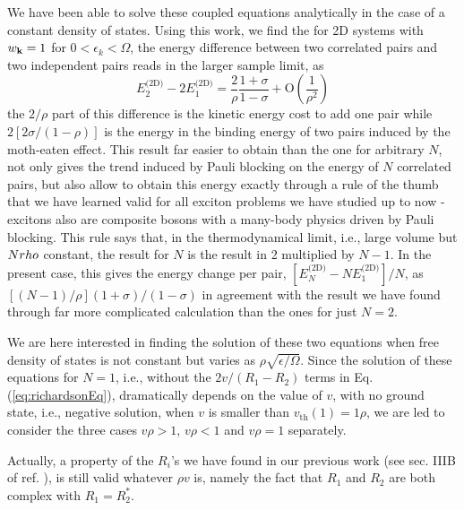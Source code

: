 \documentclass{article}
\newcommand{\td}{{\ensuremath{{\text{(2D)}}}}}
\begin{document}
We have been able to solve these coupled equations analytically in the case of a constant density of states\cite{combescotBCS}.  Using this work, we find the for 2D systems with $w_{\mathbf{k}}=1$ for $0<\epsilon_k<\Omega$, the energy difference between two correlated pairs and two independent pairs reads in the larger sample limit, as 
\begin{equation}
E^{\td}_2-2E_1^{\td}=\frac{2}{\rho}\frac{1+\sigma}{1-\sigma}+\text{O}(\frac{1}{\rho^2})
\label{eq:}
\end{equation}
the $2/\rho$ part of this difference is the kinetic energy cost to add one pair while $2[2\sigma/(1-\rho)]$ is the energy in the binding energy of two pairs induced by the moth-eaten effect. This result far easier to obtain than the one for arbitrary $N$, not only gives the trend induced by Pauli blocking on the energy of $N$ correlated pairs, but also allow to obtain this energy exactly through a rule of the thumb that we have learned valid for all exciton problems we have studied up to now -excitons also are composite bosons with a many-body physics driven by Pauli blocking.  This rule says that, in the thermodynamical limit, i.e., large volume but $N\\rho$ constant, the result for $N$ is the result in 2 multiplied by $N-1$.  In the present case, this gives the energy change per pair, $[E^{\td}_N-NE^{\td}_1]/N$, as $[(N-1)/\rho](1+\sigma)/(1-\sigma)$ in agreement with the result we have found through far more complicated calculation than the ones for just $N=2$.

We are here interested in finding the solution of these two equations when free density of states is not constant but varies as $\rho\sqrt{\epsilon/\Omega}$.  Since the solution of these equations for $N=1$, i.e., without the $2v/(R_1-R_2)$ terms in Eq. (\ref{eq:richardsonEq}), dramatically depends on the value of $v$, with no ground state, i.e., negative solution, when $v$ is smaller than $v_{\text{th}}(1)=1\rho$, we are led to consider the three cases $v\rho>1$, $v\rho<1$ and $v\rho=1$ separately. 

Actually, a property of the $R_i$'s we have found in our previous work (see sec. IIIB of ref. \cite{combescotBCS}), is still valid whatever $\rho{}v$ is, namely the fact that $R_1$ and $R_2$ are both complex with $R_1=R_2^*$.%

\end{document}

